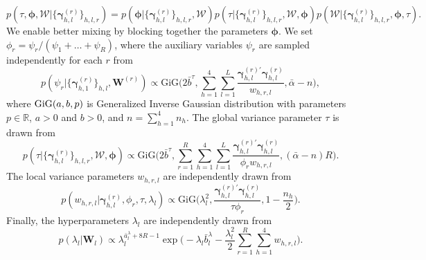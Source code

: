 \documentclass[12pt,a4paper]{article}
\newcommand*{\norm}[1]{\big\lVert#1\big\rVert}		%
\def \R{\mathds{R}}
\theoremstyle{custom}
\begin{document}
\begin{equation}
p(\tau, \boldsymbol{\phi}, \mathcal{W} | \lbrace \boldsymbol{\gamma}_{h,l}^{(r)} \rbrace_{h,l,r}) = p( \boldsymbol{\phi} | \lbrace \boldsymbol{\gamma}_{h,l}^{(r)} \rbrace_{h,l,r}, \mathcal{W}) p( \tau | \lbrace \boldsymbol{\gamma}_{h,l}^{(r)} \rbrace_{h,l,r}, \mathcal{W}, \boldsymbol{\phi}) p( \mathcal{W} | \lbrace \boldsymbol{\gamma}_{h,l}^{(r)} \rbrace_{h,l,r}, \boldsymbol{\phi}, \tau).
\end{equation}
We enable better mixing by blocking together the parameters $\boldsymbol{\phi}$. We set $\phi_r = \psi_r / (\psi_1 + \ldots + \psi_R)$, where the auxiliary variables $\psi_r$ are sampled independently for each $r$ from
\begin{equation}
p( \psi_r | \lbrace \boldsymbol{\gamma}_{h,1}^{(r)} \rbrace_{h,l}, \mathbf{W}^{(r)}) \propto \text{GiG} \Big( 2\bar{b}^\tau, \sum_{h=1}^4 \sum_{l=1}^L \frac{\boldsymbol{\gamma}_{h,l}^{(r)\prime} \boldsymbol{\gamma}_{h,l}^{(r)}}{w_{h,r,l}}, \bar{\alpha}-n \Big),
\label{eq:posterior_psir}
\end{equation}
where $\textnormal{GiG}(a,b,p)$ is Generalized Inverse Gaussian distribution with parameters $p \in \R$, $a >0$ and $b >0$, and $n=\sum_{h=1}^4 n_h$.
The global variance parameter $\tau$ is drawn from
\begin{equation}
p( \tau | \lbrace \boldsymbol{\gamma}_{h,l}^{(r)} \rbrace_{h,l,r}, \mathcal{W}, \boldsymbol{\phi}) \propto \text{GiG} \Big( 2\bar{b}^\tau, \sum_{r=1}^R \sum_{h=1}^4 \sum_{l=1}^L \frac{\boldsymbol{\gamma}_{h,l}^{(r)\prime} \boldsymbol{\gamma}_{h,l}^{(r)}}{\phi_r w_{h,r,l}}, (\bar{\alpha}-n)R \Big).
\label{eq:posterior_tau}
\end{equation}
The local variance parameters $w_{h,r,l}$ are independently drawn from
\begin{equation}
p( w_{h,r,l} | \boldsymbol{\gamma}_{h,l}^{(r)}, \phi_r, \tau, \lambda_l) \propto \text{GiG} \Big( \lambda_l^2, \frac{\boldsymbol{\gamma}_{h,l}^{(r)\prime} \boldsymbol{\gamma}_{h,l}^{(r)}}{\tau \phi_r}, 1-\frac{n_h}{2} \Big).
\label{eq:posterior_w}
\end{equation}
Finally, the hyperparameters $\lambda_l$ are independently drawn from
\begin{equation}
p( \lambda_l | \mathbf{W}_l ) \propto \lambda_l^{\bar{a}_l^\lambda +8R -1} \exp\Big( -\lambda_l \bar{b}_l^\lambda -\frac{\lambda_l^2}{2}\sum_{r=1}^R \sum_{h=1}^4 w_{h,r,l} \Big). 
\label{eq:posterior_lambda}
\end{equation}
\end{document}
